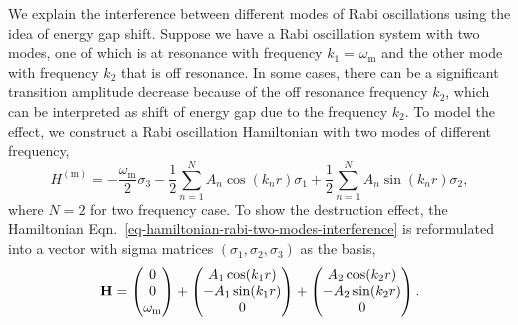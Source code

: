 


We explain the interference between different modes of Rabi oscillations using the idea of energy gap shift. Suppose we have a Rabi oscillation system with two modes, one of which is at resonance with frequency $k_1=\omega_{\mathrm m}$ and the other mode with frequency $k_2$ that is off resonance. In some cases, there can be a significant transition amplitude decrease because of the off resonance frequency $k_2$, which can be interpreted as shift of energy gap due to the frequency $k_2$. To model the effect, we construct a Rabi oscillation Hamiltonian with two modes of different frequency,
\begin{equation}
H^{(\mathrm{m})}  = -\frac{\omega_{\mathrm{m}}}{2} \sigma_3 - \frac{1}{2} \sum_{n=1}^N  A_n \cos (k_n r) \sigma_1 + \frac{1}{2} \sum_{n=1}^N  A_n \sin (k_n r) \sigma_2,
\label{eq-hamiltonian-rabi-two-modes-interference}
\end{equation}
where $N=2$ for two frequency case. To show the destruction effect, the Hamiltonian Eqn.~\ref{eq-hamiltonian-rabi-two-modes-interference} is reformulated into a vector with sigma matrices $(\sigma_1,\sigma_2,\sigma_3)$ as the basis,
\begin{equation}
\mathbf H = \begin{pmatrix}
0\\
0\\
\omega_\mathrm m
\end{pmatrix} + \begin{pmatrix}
A_1 \cos (k_1 r)\\
-A_1 \sin (k_1 r)\\
0
\end{pmatrix} + \begin{pmatrix}
A_2 \cos (k_2 r)\\
-A_2 \sin (k_2 r)\\
0
\end{pmatrix}.
\end{equation}

